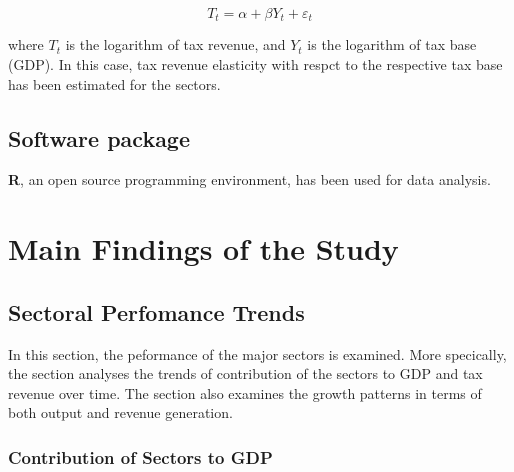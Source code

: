 \documentclass[12pt,a4paper,final]{article}
\begin{document}
\[ T_t = \alpha + \beta Y_t + \varepsilon_t \]

where $T_t$ is the logarithm of tax revenue, and $Y_t$ is the logarithm of tax base (GDP). In this case, tax revenue elasticity with respct to the respective tax base has been estimated for the sectors.

\subsection{Software package}
\textbf{R}, an open source programming environment,  has been used for data analysis. 

\section{Main Findings of the Study}

\subsection{Sectoral Perfomance Trends}

In this section, the peformance of the major sectors is examined.  More specically, the section analyses the trends of contribution of the sectors to GDP and tax revenue over time.  The section also examines the growth patterns in terms of both output and revenue generation.

\subsubsection{Contribution of Sectors to GDP}
\end{document}
